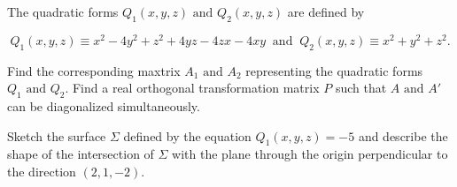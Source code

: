 \documentclass[a4paper,12pt]{report}
\begin{document}
{The quadratic forms \(Q_1 (x,y,z) \text { and } Q_2 (x,y,z)\) are defined by 

\begin{equation}
    Q_1 (x,y,z) \equiv x^2-4y^2+z^2+4yz-4zx-4xy ~\text { and }~ Q_2 (x,y,z)\equiv x^2+y^2+z^2.
\end{equation}

Find the corresponding maxtrix \(A_1 \text { and } A_2 \) representing the quadratic forms \(Q_1 \text { and } Q_2 \). Find a real orthogonal transformation matrix \(P\) such that \(A \text { and } A'\) can be diagonalized simultaneously. 

Sketch the surface \(\Sigma \)  defined by the equation \(Q_1 (x,y,z) = -5\) and describe the shape of the intersection of \(\Sigma \) with the plane through the origin perpendicular to the direction \((2,1,-2)\).  
}
\end{document}
